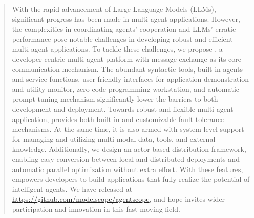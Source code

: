 \begin{abstract}
With the rapid advancement of Large Language Models (LLMs), significant progress has been made in multi-agent applications.  
However, the complexities in coordinating agents' cooperation and LLMs' erratic performance pose notable challenges in developing robust and efficient multi-agent applications. 
To tackle these challenges, we propose \textbf{\ours}, a developer-centric multi-agent platform with message exchange as its core communication mechanism. 
The abundant syntactic tools, built-in agents and service functions, user-friendly  interfaces for application demonstration and utility monitor, zero-code programming workstation, and automatic prompt tuning mechanism significantly lower the barriers to both development and deployment. 
Towards robust and flexible multi-agent application, \ours provides both built-in and customizable fault tolerance mechanisms. 
At the same time, it is also armed with system-level support for managing and utilizing multi-modal data, tools, and external knowledge.
Additionally, we design an actor-based distribution framework, enabling easy conversion between local and distributed deployments and automatic parallel optimization without extra effort. 
With these features, \ours empowers developers to build applications that fully realize the potential of intelligent agents.
We have released \ours at \url{https://github.com/modelscope/agentscope}, and hope \ours invites wider participation and innovation in this fast-moving field. 
\end{abstract}
